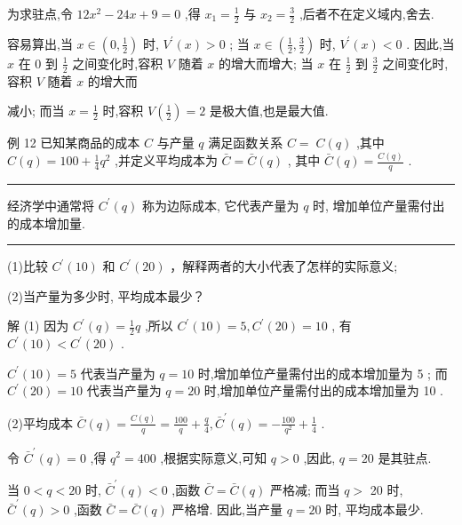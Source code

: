 \documentclass[10pt]{article}
\newcommand{\HRule}{\begin{center}\rule{0.9\linewidth}{0.2mm}\end{center}}
\begin{document}
为求驻点,令 \({12}{x}^{2} - {24x} + 9 = 0\) ,得 \({x}_{1} = \frac{1}{2}\) 与 \({x}_{2} = \frac{3}{2}\) ,后者不在定义域内,舍去.

容易算出,当 \(x \in  \left( {0,\frac{1}{2}}\right)\) 时, \({V}^{\prime }\left( x\right)  > 0\) ; 当 \(x \in  \left( {\frac{1}{2},\frac{3}{2}}\right)\) 时, \({V}^{\prime }\left( x\right)  < 0\) . 因此,当 \(x\) 在 0 到 \(\frac{1}{2}\) 之间变化时,容积 \(V\) 随着 \(x\) 的增大而增大; 当 \(x\) 在 \(\frac{1}{2}\) 到 \(\frac{3}{2}\) 之间变化时,容积 \(V\) 随着 \(x\) 的增大而



减小; 而当 \(x = \frac{1}{2}\) 时,容积 \(V\left( \frac{1}{2}\right)  = 2\) 是极大值,也是最大值.

例 12 已知某商品的成本 \(C\) 与产量 \(q\) 满足函数关系 \(C = \; C\left( q\right)\) ,其中 \(C\left( q\right)  = {100} + \frac{1}{4}{q}^{2}\) ,并定义平均成本为 \(\bar{C} = \bar{C}\left( q\right)\) , 其中 \(\bar{C}\left( q\right)  = \frac{C\left( q\right) }{q}\) .

\HRule

经济学中通常将 \({C}^{\prime }\left( q\right)\) 称为边际成本, 它代表产量为 \(q\) 时, 增加单位产量需付出的成本增加量.

\HRule

(1)比较 \({C}^{\prime }\left( {10}\right)\) 和 \({C}^{\prime }\left( {20}\right)\) ，解释两者的大小代表了怎样的实际意义;

(2)当产量为多少时, 平均成本最少？

解 (1) 因为 \({C}^{\prime }\left( q\right)  = \frac{1}{2}q\) ,所以 \({C}^{\prime }\left( {10}\right)  = 5,{C}^{\prime }\left( {20}\right)  = {10}\) , 有 \({C}^{\prime }\left( {10}\right)  < {C}^{\prime }\left( {20}\right)\) .

\({C}^{\prime }\left( {10}\right)  = 5\) 代表当产量为 \(q = {10}\) 时,增加单位产量需付出的成本增加量为 5 ; 而 \({C}^{\prime }\left( {20}\right)  = {10}\) 代表当产量为 \(q = {20}\) 时,增加单位产量需付出的成本增加量为 10 .

(2)平均成本 \(\bar{C}\left( q\right)  = \frac{C\left( q\right) }{q} = \frac{100}{q} + \frac{q}{4},{\bar{C}}^{\prime }\left( q\right)  =  - \frac{100}{{q}^{2}} + \frac{1}{4}\) .

令 \({\bar{C}}^{\prime }\left( q\right)  = 0\) ,得 \({q}^{2} = {400}\) ,根据实际意义,可知 \(q > 0\) ,因此, \(q = {20}\) 是其驻点.

当 \(0 < q < {20}\) 时, \({\bar{C}}^{\prime }\left( q\right)  < 0\) ,函数 \(\bar{C} = \bar{C}\left( q\right)\) 严格减; 而当 \(q >\) 20 时, \({\bar{C}}^{\prime }\left( q\right)  > 0\) ,函数 \(\bar{C} = \bar{C}\left( q\right)\) 严格增. 因此,当产量 \(q = {20}\) 时, 平均成本最少.
\end{document}
